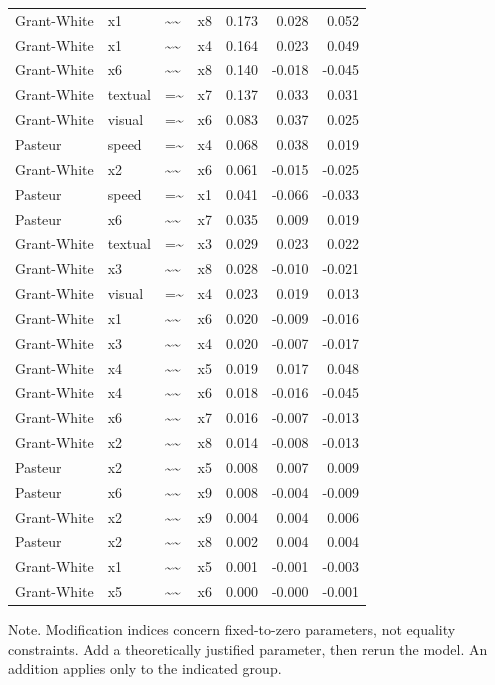 \documentclass[11pt]{article}
\begin{document}
\begin{longtable}{llllrrr}
Grant-White & x1 & \textasciitilde{}\textasciitilde{} & x8 & 0.173 & 0.028 & 0.052 \\
Grant-White & x1 & \textasciitilde{}\textasciitilde{} & x4 & 0.164 & 0.023 & 0.049 \\
Grant-White & x6 & \textasciitilde{}\textasciitilde{} & x8 & 0.140 & -0.018 & -0.045 \\
Grant-White & textual & =\textasciitilde{} & x7 & 0.137 & 0.033 & 0.031 \\
Grant-White & visual & =\textasciitilde{} & x6 & 0.083 & 0.037 & 0.025 \\
Pasteur & speed & =\textasciitilde{} & x4 & 0.068 & 0.038 & 0.019 \\
Grant-White & x2 & \textasciitilde{}\textasciitilde{} & x6 & 0.061 & -0.015 & -0.025 \\
Pasteur & speed & =\textasciitilde{} & x1 & 0.041 & -0.066 & -0.033 \\
Pasteur & x6 & \textasciitilde{}\textasciitilde{} & x7 & 0.035 & 0.009 & 0.019 \\
Grant-White & textual & =\textasciitilde{} & x3 & 0.029 & 0.023 & 0.022 \\
Grant-White & x3 & \textasciitilde{}\textasciitilde{} & x8 & 0.028 & -0.010 & -0.021 \\
Grant-White & visual & =\textasciitilde{} & x4 & 0.023 & 0.019 & 0.013 \\
Grant-White & x1 & \textasciitilde{}\textasciitilde{} & x6 & 0.020 & -0.009 & -0.016 \\
Grant-White & x3 & \textasciitilde{}\textasciitilde{} & x4 & 0.020 & -0.007 & -0.017 \\
Grant-White & x4 & \textasciitilde{}\textasciitilde{} & x5 & 0.019 & 0.017 & 0.048 \\
Grant-White & x4 & \textasciitilde{}\textasciitilde{} & x6 & 0.018 & -0.016 & -0.045 \\
Grant-White & x6 & \textasciitilde{}\textasciitilde{} & x7 & 0.016 & -0.007 & -0.013 \\
Grant-White & x2 & \textasciitilde{}\textasciitilde{} & x8 & 0.014 & -0.008 & -0.013 \\
Pasteur & x2 & \textasciitilde{}\textasciitilde{} & x5 & 0.008 & 0.007 & 0.009 \\
Pasteur & x6 & \textasciitilde{}\textasciitilde{} & x9 & 0.008 & -0.004 & -0.009 \\
Grant-White & x2 & \textasciitilde{}\textasciitilde{} & x9 & 0.004 & 0.004 & 0.006 \\
Pasteur & x2 & \textasciitilde{}\textasciitilde{} & x8 & 0.002 & 0.004 & 0.004 \\
Grant-White & x1 & \textasciitilde{}\textasciitilde{} & x5 & 0.001 & -0.001 & -0.003 \\
Grant-White & x5 & \textasciitilde{}\textasciitilde{} & x6 & 0.000 & -0.000 & -0.001 \\
\bottomrule
\end{longtable}
\noindent Note. Modification indices concern fixed-to-zero parameters, not equality constraints. Add a theoretically justified parameter, then rerun the model. An addition applies only to the indicated group.\par
\end{document}
